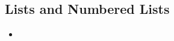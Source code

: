 \maketitle

\subsection{Lists and Numbered Lists}
\begin{frame}[t]{\insertsubsection}
	\begin{itemize}
		\item
	\end{itemize}
\end{frame}
